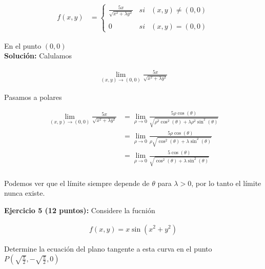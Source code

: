 \documentclass[a4paper]{article}
\begin{document}
\begin{align*}
    f(x,y) &= \left\{ \begin{array}{lcc} \frac{5x}{\sqrt{x^2+\lambda y^2}} & si & (x,y) \neq (0,0) \\ \\ 0 & si & (x,y)=(0,0)\end{array} \right.
\end{align*}

En el punto $(0,0)$ \\

\textbf{Solución: } Calulamos

\begin{align*}
    \lim_{(x,y) \to (0,0)}  \frac{5x}{\sqrt{x^2+\lambda y^2}} 
\end{align*}

Pasamos a polares


\begin{align*}
    \lim_{(x,y) \to (0,0)}  \frac{5x}{\sqrt{x^2+\lambda y^2}} &= \lim_{\rho\to 0}   \frac{5\rho \cos(\theta)}{\sqrt{\rho^2\cos^2(\theta)+\lambda \rho^2\sin^2(\theta)}} \\
    &= \lim_{\rho\to 0}   \frac{5\rho \cos(\theta)}{\rho\sqrt{\cos^2(\theta)+\lambda \sin^2(\theta)}} \\
    &= \lim_{\rho\to 0}   \frac{5\cos(\theta)}{\sqrt{\cos^2(\theta)+\lambda \sin^2(\theta)}} \\
\end{align*}

Podemos ver que el límite siempre depende de $\theta$ para $\lambda > 0$, por lo tanto el límite nunca existe. \\




















\newpage

\textbf{Ejercicio 5 \textbf{(12 puntos)}:} Considere la fucnión

\begin{align*}
    f(x,y) = x\sin(x^2+y^2)
\end{align*}

Determine la ecuación del plano tangente a esta curva en el punto $\displaystyle P \left( \sqrt{\frac{\pi}{2}}, - \sqrt{\frac{\pi}{2}}, 0 \right)$ \\
\end{document}
